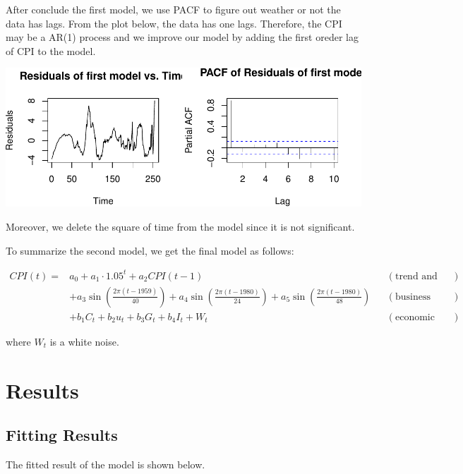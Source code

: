 \documentclass[
  man,floatsintext,
  man]{apa6}
\begin{document}
After conclude the first model, we use PACF to figure out weather or not the data has lags.
From the plot below, the data has one lags.
Therefore, the CPI may be a AR(1) process
and we improve our model by adding the first oreder lag of CPI to the model.

\includegraphics{stat429_group2_final_proj_files/figure-latex/unnamed-chunk-4-1.pdf}

Moreover, we delete the square of time from the model since it is not significant.

To summarize the second model, we get the final model as follows:

\begin{align*}
CPI(t) =& a_0 + a_1 \cdot 1.05^t + a_2 CPI(t-1)  && (\text{trend and lags})\\
& + a_3 \sin\left(\frac{2\pi(t-1959)}{40}\right) + a_4 \sin\left(\frac{2\pi(t-1980)}{24}\right) + a_5 \sin\left(\frac{2\pi(t-1980)}{48}\right) && (\text{business cycle})\\
& + b_1 C_t + b_2 u_t + b_3 G_t + b_4 I_t + W_t && (\text{economic variables})
\end{align*}

where \(W_t\) is a white noise.

\hypertarget{results}{%
\section{Results}\label{results}}

\hypertarget{fitting-results}{%
\subsection{Fitting Results}\label{fitting-results}}

The fitted result of the model is shown below.
\end{document}
